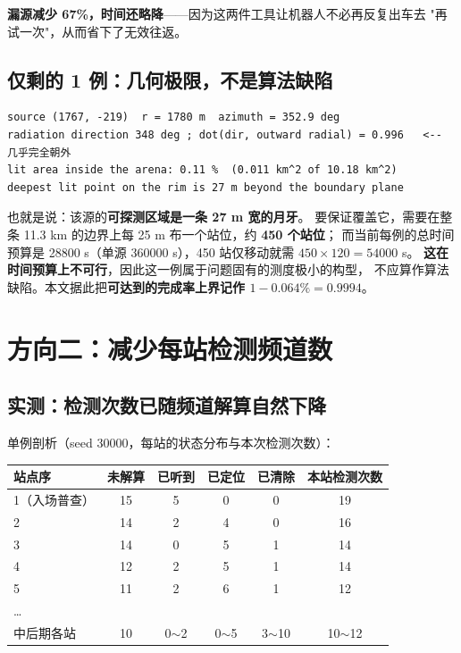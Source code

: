 \textbf{漏源减少 67\%，时间还略降}——因为这两件工具让机器人不必再反复出车去
"再试一次"，从而省下了无效往返。

\subsection{仅剩的 1 例：几何极限，不是算法缺陷}

\begin{lstlisting}[caption={seed 51029 / ch2 的几何核算}]
source (1767, -219)  r = 1780 m  azimuth = 352.9 deg
radiation direction 348 deg ; dot(dir, outward radial) = 0.996   <-- 几乎完全朝外
lit area inside the arena: 0.11 %  (0.011 km^2 of 10.18 km^2)
deepest lit point on the rim is 27 m beyond the boundary plane
\end{lstlisting}

也就是说：该源的\textbf{可探测区域是一条 27 m 宽的月牙}。
要保证覆盖它，需要在整条 11.3 km 的边界上每 25 m 布一个站位，约 \textbf{450 个站位}；
而当前每例的总时间预算是 28800 s（单源 360000 s），450 站仅移动就需 $450\times120=54000$ s。
\textbf{这在时间预算上不可行}，因此这一例属于问题固有的测度极小的构型，
不应算作算法缺陷。本文据此把\textbf{可达到的完成率上界记作 $1-0.064\%=0.9994$}。

\section{方向二：减少每站检测频道数}

\subsection{实测：检测次数已随频道解算自然下降}

单例剖析（seed 30000，每站的状态分布与本次检测次数）：

\begin{center}
\small
\begin{tabular}{lccccc}
\toprule
站点序 & 未解算 & 已听到 & 已定位 & 已清除 & 本站检测次数 \\ \midrule
1（入场普查） & 15 & 5 & 0 & 0 & 19 \\
2 & 14 & 2 & 4 & 0 & 16 \\
3 & 14 & 0 & 5 & 1 & 14 \\
4 & 12 & 2 & 5 & 1 & 14 \\
5 & 11 & 2 & 6 & 1 & 12 \\
\dots & & & & & \\
中后期各站 & 10 & 0$\sim$2 & 0$\sim$5 & 3$\sim$10 & 10$\sim$12 \\
\bottomrule
\end{tabular}
\end{center}

